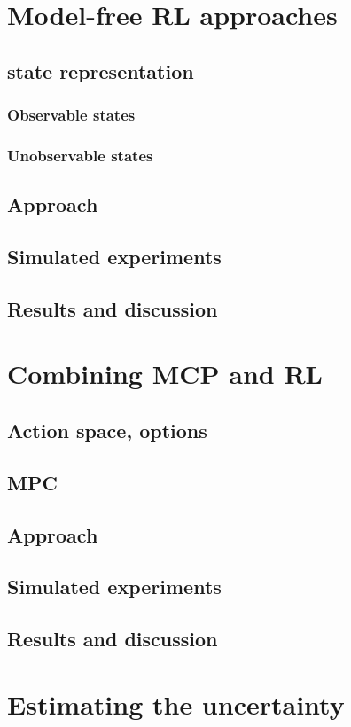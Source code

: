 \chapter{Model-free RL approaches}
\section{state representation}
\subsection{Observable states}
\subsection{Unobservable states}
\section{Approach}
\section{Simulated experiments}
\section{Results and discussion}

\chapter{Combining MCP and RL}
\section{Action space, options}
\section{MPC}
\section{Approach}
\section{Simulated experiments}
\section{Results and discussion}

\chapter{Estimating the uncertainty}

